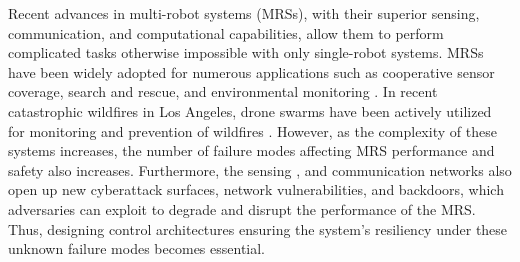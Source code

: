 Recent advances in multi-robot systems (MRSs), with their superior sensing, communication, and computational capabilities, allow them to perform complicated tasks otherwise impossible with only single-robot systems. MRSs have been widely adopted for numerous applications such as cooperative sensor coverage\cite{cortes2004coverage}, search and rescue\cite{kantor2006distributed}, and environmental monitoring \cite{burgard2005coordinated}. In recent catastrophic wildfires in Los Angeles, drone swarms have been actively utilized for monitoring and prevention of wildfires \cite{wildfire2025wong}. However, as the complexity of these systems increases, the number of failure modes affecting MRS performance and safety also increases. Furthermore, the sensing \cite{khan2023synthesis, pant2024adversarial}, and communication networks \cite{rezaee2024resilient} also open up new cyberattack surfaces, network vulnerabilities, and backdoors, which adversaries can exploit to degrade and disrupt the performance of the MRS. Thus, designing control architectures ensuring the system's resiliency under these unknown failure modes becomes essential. 


